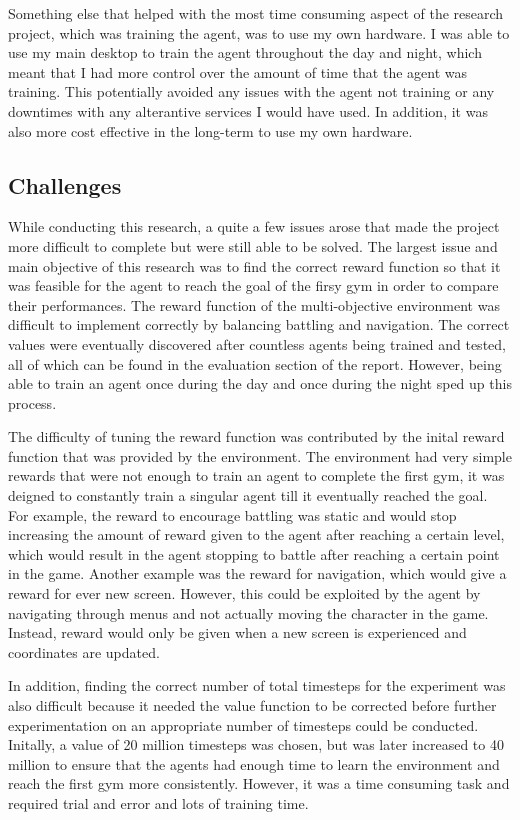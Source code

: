 Something else that helped with the most time consuming aspect of the research project, which was training the agent, was to use my own hardware. I was able to use my main desktop to train the agent throughout the day and night, which meant that I had more control over the amount of time that the agent was training. This potentially avoided any issues with the agent not training or any downtimes with any alterantive services I would have used. In addition, it was also more cost effective in the long-term to use my own hardware.

\subsection{Challenges}

While conducting this research, a quite a few issues arose that made the project more difficult to complete but were still able to be solved. The largest issue and main objective of this research was to find the correct reward function so that it was feasible for the agent to reach the goal of the firsy gym in order to compare their performances. The reward function of the multi-objective environment was difficult to implement correctly by balancing battling and navigation. The correct values were eventually discovered after countless agents being trained and tested, all of which can be found in the evaluation section of the report. However, being able to train an agent once during the day and once during the night sped up this process. 

The difficulty of tuning the reward function was contributed by the inital reward function that was provided by the environment. The environment had very simple rewards that were not enough to train an agent to complete the first gym, it was deigned to constantly train a singular agent till it eventually reached the goal. For example, the reward to encourage battling was static and would stop increasing the amount of reward given to the agent after reaching a certain level, which would result in the agent stopping to battle after reaching a certain point in the game. Another example was the reward for navigation, which would give a reward for ever new screen. However, this could be exploited by the agent by navigating through menus and not actually moving the character in the game. Instead, reward would only be given when a new screen is experienced and coordinates are updated. 

In addition, finding the correct number of total timesteps for the experiment was also difficult because it needed the value function to be corrected before further experimentation on an appropriate number of timesteps could be conducted. Initally, a value of 20 million timesteps was chosen, but was later increased to 40 million to ensure that the agents had enough time to learn the environment and reach the first gym more consistently. However, it was a time consuming task and required trial and error and lots of training time.

